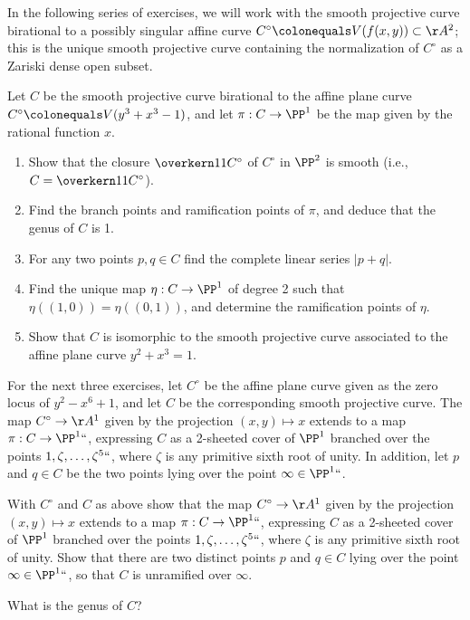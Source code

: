 In the following series of exercises, we will work with the
smooth projective curve birational 
to a possibly 
%
singular affine curve
%
$C^\circ \colonequals V(f(x,y)) \subset \AA^2$; this is the unique smooth
projective curve containing the normalization of $C^\circ$ as a
Zariski dense open subset.

\begin{exercise}
\def\ovCcirc{\overkern11{C^\circ}}
Let $C$ be the smooth projective curve birational to the affine plane curve $C^\circ \colonequals V(y^3 +x^3 - 1)$, and let $\pi : C \to \PP^1$ be the map given by the rational function $x$.
\begin{enumerate}
\item Show that the closure $\ovCcirc$ of $C^\circ$ in $\PP^2$ is smooth (i.e., $C = \ovCcirc$). 
\item Find the 
branch points and ramification points
of $\pi$, and deduce that the genus of $C$ is 1.
\item For any two points $p, q \in C$ find the complete linear series
  $|p+q|$. 
\item Find the unique 
map $\eta : C \to \PP^1$ of degree 2 such that $\eta((1,0)) = \eta((0,1))$, 
and determine the ramification points of $\eta$.
\item Show that $C$ is isomorphic to the smooth projective curve associated to the affine plane curve $y^2 +x^3 = 1$.
\end{enumerate}
\end{exercise}

For the next three exercises, let $C^\circ$ be the affine plane curve
given as the zero locus of $y^2 - x^6 +1$, and let $C$ be the
corresponding smooth projective curve. 
The map $C^\circ \to
\AA^1$ given by the projection $(x,y) \mapsto x$ extends to a map $\pi
: C \to \PP^1` `$, expressing $C$ as a 2-sheeted cover of $\PP^1$
branched over the points $1, \zeta, \dots, \zeta^5` `$, where $\zeta$
is any primitive sixth root of unity. In addition, let $p$ and $q \in
C$ be the two points lying over the point $\infty \in \PP^1` `$.

\begin{exercise}\label{hyperelliptic curve a}
With $C^\circ$ and $C$  as above show  that the map $C^\circ \to
\AA^1$ given by the projection $(x,y) \mapsto x$ extends to a map $\pi
: C \to \PP^1` `$, expressing $C$ as a 2-sheeted cover of $\PP^1$
branched over the points $1, \zeta, \dots, \zeta^5` `$, where $\zeta$
is any primitive sixth root of unity. Show that there are two distinct
points $p$ and $q \in C$  lying over the point $\infty \in \PP^1` `$,
so that $C$ is unramified over $\infty$.

What is the genus of $C$?
\end{exercise}

